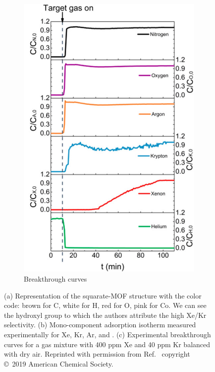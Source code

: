 \documentclass[main]{subfiles}
\begin{document}
\begin{figure}[ht]
\begin{subfigure}[b]{0.25\textwidth}
    \includegraphics[width=\textwidth]{figures/6-perspectives/jacs_li_breakthrough.jpg}
    \caption{Breakthrough curves}\label{fgr:jacs_li_breakthrough}
  \end{subfigure}
  \caption{ (a) Representation of the squarate-MOF  structure with the color code: brown for C, white for H, red for O, pink for Co. We can see the hydroxyl group to which the authors attribute the high Xe/Kr selectivity. (b) Mono-component adsorption isotherm measured experimentally for Xe, Kr, Ar,  and . (c) Experimental breakthrough curves for a gas mixture with 400 ppm Xe and 40 ppm Kr balanced with dry air. Reprinted with permission from Ref.~\cite{Li_2019} copyright \copyright\ 2019 American Chemical Society. }\label{fgr:jacs_li}
\end{figure}
\end{document}
